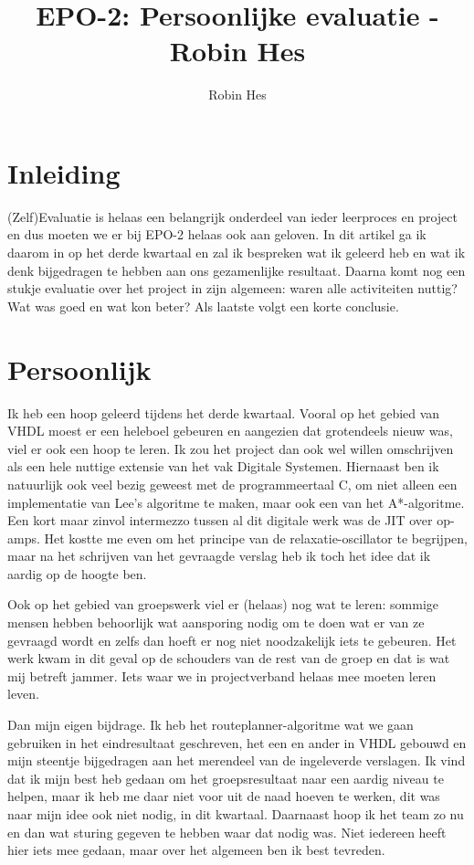 \documentclass{article}
\title{EPO-2: Persoonlijke evaluatie - Robin Hes}
\author{Robin Hes}
\begin{document}
\maketitle

\section*{Inleiding}

(Zelf)Evaluatie is helaas een belangrijk onderdeel van ieder leerproces en project en dus moeten we er bij EPO-2 helaas ook aan geloven. In dit artikel ga ik daarom in op het derde kwartaal en zal ik bespreken wat ik geleerd heb en wat ik denk bijgedragen te hebben aan ons gezamenlijke resultaat. Daarna komt nog een stukje evaluatie over het project in zijn algemeen: waren alle activiteiten nuttig? Wat was goed en wat kon beter? Als laatste volgt een korte conclusie.

\section*{Persoonlijk}

Ik heb een hoop geleerd tijdens het derde kwartaal. Vooral op het gebied van VHDL moest er een heleboel gebeuren en aangezien dat grotendeels nieuw was, viel er ook een hoop te leren. Ik zou het project dan ook wel willen omschrijven als een hele nuttige extensie van het vak Digitale Systemen. Hiernaast ben ik natuurlijk ook veel bezig geweest met de programmeertaal C, om niet alleen een implementatie van Lee's algoritme te maken, maar ook een van het A*-algoritme. Een kort maar zinvol intermezzo tussen al dit digitale werk was de JIT over op-amps. Het kostte me even om het principe van de relaxatie-oscillator te begrijpen, maar na het schrijven van het gevraagde verslag heb ik toch het idee dat ik aardig op de hoogte ben.

Ook op het gebied van groepswerk viel er (helaas) nog wat te leren: sommige mensen hebben behoorlijk wat aansporing nodig om te doen wat er van ze gevraagd wordt en zelfs dan hoeft er nog niet noodzakelijk iets te gebeuren. Het werk kwam in dit geval op de schouders van de rest van de groep en dat is wat mij betreft jammer. Iets waar we in projectverband helaas mee moeten leren leven.

Dan mijn eigen bijdrage. Ik heb het routeplanner-algoritme wat we gaan gebruiken in het eindresultaat geschreven, het een en ander in VHDL gebouwd en mijn steentje bijgedragen aan het merendeel van de ingeleverde verslagen. Ik vind dat ik mijn best heb gedaan om het groepsresultaat naar een aardig niveau te helpen, maar ik heb me daar niet voor uit de naad hoeven te werken, dit was naar mijn idee ook niet nodig, in dit kwartaal. Daarnaast hoop ik het team zo nu en dan wat sturing gegeven te hebben waar dat nodig was. Niet iedereen heeft hier iets mee gedaan, maar over het algemeen ben ik best tevreden.
\end{document}
